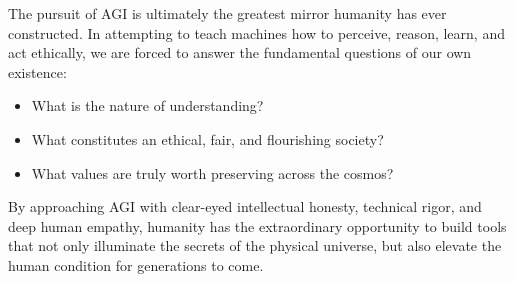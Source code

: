 \documentclass[11pt,journal,onecolumn]{IEEEtran}
\begin{document}
The pursuit of AGI is ultimately the greatest mirror humanity has ever constructed. In attempting to teach machines how to perceive, reason, learn, and act ethically, we are forced to answer the fundamental questions of our own existence:
\begin{itemize}
    \item What is the nature of understanding?
    \item What constitutes an ethical, fair, and flourishing society?
    \item What values are truly worth preserving across the cosmos?
\end{itemize}

By approaching AGI with clear-eyed intellectual honesty, technical rigor, and deep human empathy, humanity has the extraordinary opportunity to build tools that not only illuminate the secrets of the physical universe, but also elevate the human condition for generations to come.
\end{document}

